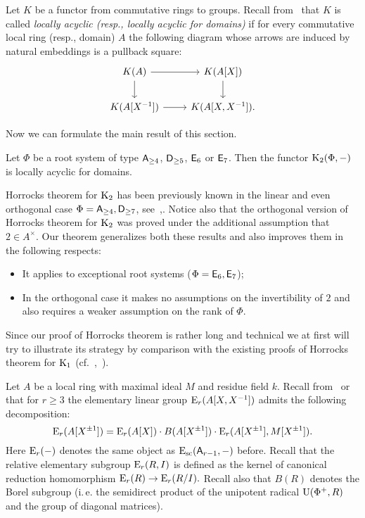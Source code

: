 \begin{dfn}
    Let $K$ be a functor from commutative rings to groups.
    Recall from~\cite{LSV2} that $K$ is called \textit{locally acyclic (resp., locally acyclic for domains)} if for every commutative local ring (resp., domain) $A$ the following diagram whose arrows are induced by natural embeddings is a pullback square:
    \begin{equation}\label{eq:P1-square} \begin{tikzcd} K(A) \ar[r] \ar[d] & K(A[X]) \arrow{d} \\ K(A[X\inv]) \ar{r} & K(A[X, X\inv]). \end{tikzcd} \end{equation}
\end{dfn}

Now we can formulate the main result of this section.
\begin{thm}\label{thm:horrocks-k2}
Let $\Phi$ be a root system of type $\mathsf{A}_{\geq 4}$, $\mathsf{D}_{\geq 5}$, $\mathsf{E}_6$ or $\mathsf{E}_7$.
Then the functor $\operatorname{K}_{2}(\Phi, -)$ is locally acyclic for domains.
\end{thm}
Horrocks theorem for $\operatorname{K}_2$ has been previously known in the linear and even orthogonal case $\Phi=\mathsf{A}_{\geq 4},\mathsf{D}_{\geq 7}$, see~\cite[Theorem~1]{LS20},\cite[Proposition~4.3]{Tu83}.
Notice also that the orthogonal version of Horrocks theorem for $\operatorname{K}_2$ was proved under the additional assumption that $2 \in A^\times$.
Our theorem generalizes both these results and also improves them in the following respects:
\begin{itemize}
    \item It applies to exceptional root systems ($\Phi = \mathsf{E}_6, \mathsf{E}_7$);
    \item In the orthogonal case it makes no assumptions on the invertibility of $2$ and also requires a weaker assumption on the rank of $\Phi$.
\end{itemize}

Since our proof of Horrocks theorem is rather long and technical we at first will try to illustrate its strategy
 by comparison with the existing proofs of Horrocks theorem for $\operatorname{K}_1$ (cf.~\cite{Abe83, St-poly},~\cite[\S~VI.6]{Lam10}).

Let $A$ be a local ring with maximal ideal $M$ and residue field $k$.
Recall from~\cite[\S~4]{Su77} or~\cite[\S~VI.6]{Lam10} that for $r \geq 3$ the elementary linear group $\operatorname{E}_r(A[X, X^{-1}])$ admits the following decomposition:
\begin{equation}\label{eq:triple-decomposition}
\operatorname{E}_r(A[X^{\pm 1}]) = \operatorname{E}_r(A[X]) \cdot B(A[X^{\pm 1}]) \cdot \operatorname{E}_r(A[X^{\pm 1}], M[X^{\pm 1}]).
\end{equation}
Here $\operatorname{E}_r(-)$ denotes the same object as $\operatorname{E}_\mathrm{sc}(\mathsf{A}_{r - 1}, -)$ before.
Recall that the relative elementary subgroup $\operatorname{E}_r(R, I)$ is defined as the kernel of canonical reduction homomorphism $\operatorname{E}_r(R) \to \operatorname{E}_r(R/I).$
Recall also that $B(R)$ denotes the Borel subgroup (i.\,e. the semidirect product of the unipotent radical $\operatorname{U}(\Phi^+, R)$ and the group of diagonal matrices).

